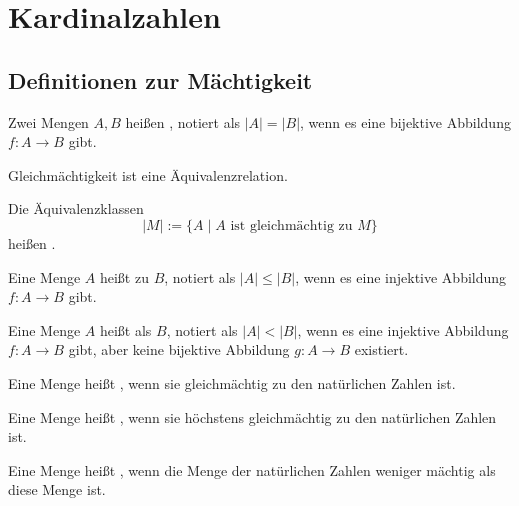 \newpage
\phantom{x}

\newpage
\section{Kardinalzahlen}
\subsection{Definitionen zur Mächtigkeit}

\begin{definition}[Gleichmächtigkeit]
Zwei Mengen $A,B$ heißen , notiert als
$|A|=|B|$, wenn es eine bijektive Abbildung $f\colon A\to B$ gibt.
\end{definition}
Gleichmächtigkeit ist eine Äquivalenzrelation.
\begin{definition}[Kardinalzahl]
Die Äquivalenzklassen
\begin{equation}
|M| := \{A\mid A\text{ ist gleichmächtig zu }M\}
\end{equation}
heißen .
\end{definition}

\begin{definition}
Eine Menge $A$ heißt  zu $B$,
notiert als $|A|\le|B|$, wenn es eine injektive Abbildung
$f\colon A\to B$ gibt.
\end{definition}

\begin{definition}
Eine Menge $A$ heißt  als $B$,
notiert als $|A|<|B|$, wenn es eine injektive Abbildung
$f\colon A\to B$ gibt, aber keine bijektive Abbildung
$g\colon A\to B$ existiert.
\end{definition}

\begin{definition}
Eine Menge heißt , wenn sie gleichmächtig
zu den natürlichen Zahlen ist.
\end{definition}

\begin{definition}
Eine Menge heißt , wenn sie höchstens
gleichmächtig zu den natürlichen Zahlen ist.
\end{definition}

\begin{definition}[Überabzählbar]
Eine Menge heißt , wenn die Menge der
natürlichen Zahlen weniger mächtig als diese Menge ist.
\end{definition}

